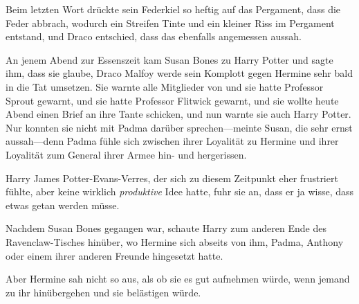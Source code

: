 Beim letzten Wort drückte sein Federkiel so heftig auf das Pergament, dass die Feder abbrach, wodurch ein Streifen Tinte und ein kleiner Riss im Pergament entstand, und Draco entschied, dass das ebenfalls angemessen aussah.

\later

An jenem Abend zur Essenszeit kam Susan Bones zu Harry Potter und sagte ihm, dass sie glaube, Draco Malfoy werde sein Komplott gegen Hermine sehr bald in die Tat umsetzen. Sie warnte alle Mitglieder von \SPHEW und sie hatte Professor Sprout gewarnt, und sie hatte Professor Flitwick gewarnt, und sie wollte heute Abend einen Brief an ihre Tante schicken, und nun warnte sie auch Harry Potter. Nur konnten sie nicht mit Padma darüber sprechen—meinte Susan, die sehr ernst aussah—denn Padma fühle sich zwischen ihrer Loyalität zu Hermine und ihrer Loyalität zum General ihrer Armee hin- und hergerissen.

Harry James Potter-Evans-Verres, der sich zu diesem Zeitpunkt eher frustriert fühlte, aber keine wirklich \emph{produktive} Idee hatte, fuhr sie an, dass er ja wisse, dass etwas getan werden müsse.

Nachdem Susan Bones gegangen war, schaute Harry zum anderen Ende des Ravenclaw-Tisches hinüber, wo Hermine sich abseits von ihm, Padma, Anthony oder einem ihrer anderen Freunde hingesetzt hatte.

Aber Hermine sah nicht so aus, als ob sie es gut aufnehmen würde, wenn jemand zu ihr hinübergehen und sie belästigen würde.

